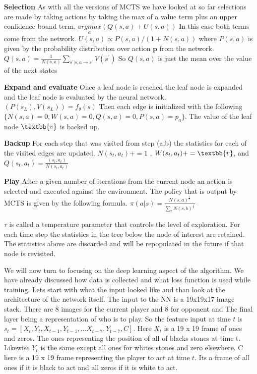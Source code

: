    \textbf{Selection} As with all the versions of MCTS we have looked at so far selections are made by taking actions by taking the max of a value term plus an upper confidence bound term. $\underset{a}{argmax} (Q(s,a) + U(s,a))$ In this case both terms come from the network. $U(s,a) \propto P(s,a) / (1 + N(s,a)) $ where $P(s,a) $ is given by the probability distribution over action $\textbf{p}$ from the network. $Q(s,a) = \frac{1}{N(s,a)}\sum_{s^{'}|s,a \rightarrow s^{'}}V(s^{'})$ So $Q(s,a)$ is just the mean over the value of the next states
   
   \textbf{Expand and evaluate} Once a leaf node is reached the leaf node is expanded and the leaf node is evaluated by the neural network. $ (P(s_{L}),V(s_{L})) = f_{\theta}(s) $ Then each edge is initialized with the following $\{ N(s,a) = 0,W(s,a) = 0,Q(s,a) = 0,P(s,a) = p_{a} \}$. The value of the leaf node $\textbb{v}$ is backed up. 
   
   \textbf{Backup} For each step that was visited from step (a,b) the statistics for each of the visited edges are updated. $N(s_{t},a_{t}) += 1$ , $W(s_{t},a_{t}) += \textbb{v} $, and $Q(s_{t},a_{t}) = \frac{(s_{t},a_{t})}{N(s_{t},a_{t})} $
   
   \textbf{Play} After a given number of iterations from the current node an action is selected and executed against the environment. The policy that is output by MCTS is given by the following formula. $\pi(a|s) = \frac{N(s,a)^{\frac{1}{\tau}}}{\sum_{b}N(s,b)^{\frac{1}{\tau}}}$
       
   $\tau$ is called a temperature parameter that controls the level of exploration. For each time step the statistics in the tree below the node of interest are retained. The statistics above are discarded and will be repopulated in the future if that node is revisited.
   
   We will now turn to focusing on the deep learning aspect of the algorithm. We have already discussed how data is collected and what loss function is used while training. Lets start with what the input looked like and than look at the architecture of the network itself. The input to the NN is a 19x19x17 image stack. There are 8 images for the current player and 8 for opponent and The final layer being a representation of who is to play. So the feature input at time $t$ is $s_{t} = [X_{t},Y_{t},X_{t - 1},Y_{t -1},... X_{t-7},Y_{t-7},C]$. Here $X_{t}$ is a 19 x 19 frame of ones and zeros. The ones representing the position of all of blacks stones at time t. Likewise $Y_{t}$ is the same except all ones for whites stones and zero elsewhere. C here is a 19 x 19 frame representing the player to act at time $t$. Its a frame of all ones if it is black to act and all zeros if it is white to act. 
   
